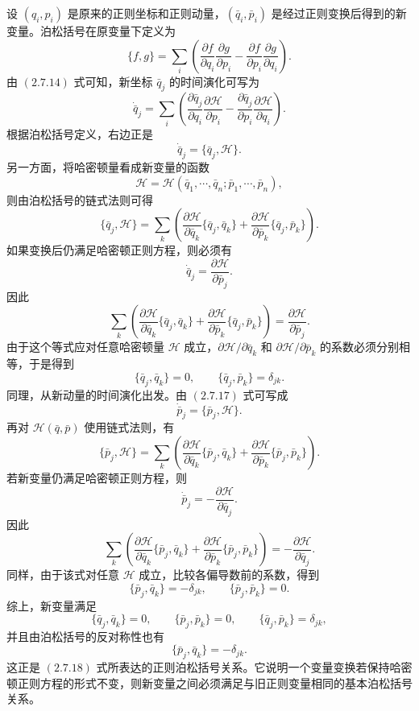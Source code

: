 \begin{solution}[正则泊松括号证明]
\answer
设 \((q_i,p_i)\) 是原来的正则坐标和正则动量，\((\bar q_i,\bar p_i)\) 是经过正则变换后得到的新变量。泊松括号在原变量下定义为
\[
\{f,g\}
=
\sum_i
\left(
\frac{\partial f}{\partial q_i}\frac{\partial g}{\partial p_i}
-
\frac{\partial f}{\partial p_i}\frac{\partial g}{\partial q_i}
\right).
\]
由 \((2.7.14)\) 式可知，新坐标 \(\bar q_j\) 的时间演化可写为
\[
\dot{\bar q}_j
=
\sum_i
\left(
\frac{\partial \bar q_j}{\partial q_i}\frac{\partial \mathcal H}{\partial p_i}
-
\frac{\partial \bar q_j}{\partial p_i}\frac{\partial \mathcal H}{\partial q_i}
\right).
\]
根据泊松括号定义，右边正是
\[
\dot{\bar q}_j=\{\bar q_j,\mathcal H\}.
\]
另一方面，将哈密顿量看成新变量的函数
\[
\mathcal H=\mathcal H(\bar q_1,\cdots,\bar q_n;\bar p_1,\cdots,\bar p_n),
\]
则由泊松括号的链式法则可得
\[
\{\bar q_j,\mathcal H\}
=
\sum_k
\left(
\frac{\partial \mathcal H}{\partial \bar q_k}
\{\bar q_j,\bar q_k\}
+
\frac{\partial \mathcal H}{\partial \bar p_k}
\{\bar q_j,\bar p_k\}
\right).
\]
如果变换后仍满足哈密顿正则方程，则必须有
\[
\dot{\bar q}_j=\frac{\partial \mathcal H}{\partial \bar p_j}.
\]
因此
\[
\sum_k
\left(
\frac{\partial \mathcal H}{\partial \bar q_k}
\{\bar q_j,\bar q_k\}
+
\frac{\partial \mathcal H}{\partial \bar p_k}
\{\bar q_j,\bar p_k\}
\right)
=
\frac{\partial \mathcal H}{\partial \bar p_j}.
\]
由于这个等式应对任意哈密顿量 \(\mathcal H\) 成立，\(\partial \mathcal H/\partial \bar q_k\) 和 \(\partial \mathcal H/\partial \bar p_k\) 的系数必须分别相等，于是得到
\[
\{\bar q_j,\bar q_k\}=0,\qquad
\{\bar q_j,\bar p_k\}=\delta_{jk}.
\]
同理，从新动量的时间演化出发。由 \((2.7.17)\) 式可写成
\[
\dot{\bar p}_j=\{\bar p_j,\mathcal H\}.
\]
再对 \(\mathcal H(\bar q,\bar p)\) 使用链式法则，有
\[
\{\bar p_j,\mathcal H\}
=
\sum_k
\left(
\frac{\partial \mathcal H}{\partial \bar q_k}
\{\bar p_j,\bar q_k\}
+
\frac{\partial \mathcal H}{\partial \bar p_k}
\{\bar p_j,\bar p_k\}
\right).
\]
若新变量仍满足哈密顿正则方程，则
\[
\dot{\bar p}_j=-\frac{\partial \mathcal H}{\partial \bar q_j}.
\]
因此
\[
\sum_k
\left(
\frac{\partial \mathcal H}{\partial \bar q_k}
\{\bar p_j,\bar q_k\}
+
\frac{\partial \mathcal H}{\partial \bar p_k}
\{\bar p_j,\bar p_k\}
\right)
=
-\frac{\partial \mathcal H}{\partial \bar q_j}.
\]
同样，由于该式对任意 \(\mathcal H\) 成立，比较各偏导数前的系数，得到
\[
\{\bar p_j,\bar q_k\}=-\delta_{jk},\qquad
\{\bar p_j,\bar p_k\}=0.
\]
综上，新变量满足
\[
\{\bar q_j,\bar q_k\}=0,\qquad
\{\bar p_j,\bar p_k\}=0,\qquad
\{\bar q_j,\bar p_k\}=\delta_{jk},
\]
并且由泊松括号的反对称性也有
\[
\{\bar p_j,\bar q_k\}=-\delta_{jk}.
\]
这正是 \((2.7.18)\) 式所表达的正则泊松括号关系。它说明一个变量变换若保持哈密顿正则方程的形式不变，则新变量之间必须满足与旧正则变量相同的基本泊松括号关系。
\end{solution}

